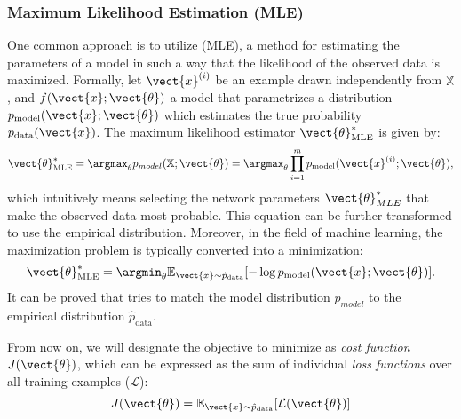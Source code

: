 \subsubsection{Maximum Likelihood Estimation (MLE)}\label{subsubsec:mle}
One common approach is to utilize  (MLE), a method for estimating the parameters of a model in such a way that the likelihood of the observed data is maximized. Formally, let $\vect{x}^{(i)}$ be an example drawn independently from $\mathbb{X}$, and $f(\vect{x};\vect{\theta})$ a model that parametrizes a distribution $p_{\text{model}}(\vect{x};\vect{\theta})$ which estimates the true probability $p_{\text{data}}(\vect{x})$. The maximum likelihood estimator $\vect{\theta}^*_{\text{MLE}}$ is given by:
\begin{equation}
    \vect{\theta}^*_{\text{MLE}} = \argmax_\theta p_{model}(\mathbb{X};\vect{\theta}) = \argmax_\theta \prod_{i=1}^m p_{\text{model}}(\vect{x}^{(i)};\vect{\theta}),
\end{equation}
which intuitively means selecting the network parameters $\vect{\theta}^*_{MLE}$ that make the observed data most probable. This equation can be further transformed to use the empirical distribution. Moreover, in the field of machine learning, the maximization problem is typically converted into a minimization:
\begin{equation}
    \vect{\theta}^*_{\text{MLE}} = \argmin_\theta \mathbb{E}_{\vect{x}\sim \hat{p}_{\text{data}}} [- \log p_{\text{model}}(\vect{x};\vect{\theta})].
    \label{eq:mle}
\end{equation}
It can be proved that  tries to match the model distribution $p_{model}$ to the empirical distribution $\hat{p}_{\text{data}}$. 

From now on, we will designate the objective to minimize as \textit{cost function} $J(\vect{\theta})$, which can be expressed as the sum of individual \textit{loss functions} over all training examples ($\mathcal{L}$):
\begin{equation}
    J(\vect{\theta}) = \mathbb{E}_{\vect{x}\sim \hat{p}_{\text{data}}} [\mathcal{L}(\vect{\theta})]
    \label{eq:cost_exp}
\end{equation}

